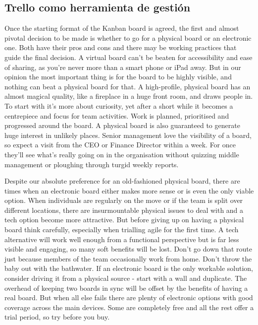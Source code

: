 \subsection{Trello como herramienta de gestión}\label{subsec:trello}

Once the starting format of the Kanban board is agreed, the
first and almost pivotal decision to be made is whether to go for
a physical board or an electronic one. Both have their pros and
cons and there may be working practices that guide the final
decision. A virtual board can't be beaten for accessibility and
ease of sharing, as you're never more than a smart phone or
iPad away. But in our opinion the most important thing is for
the board to be highly visible, and nothing can beat a physical
board for that.
A high-profile, physical board has an almost magical quality, like
a fireplace in a huge front room, and draws people in. To start
with it's more about curiosity, yet after a short while it becomes
a centrepiece and focus for team activities. Work is planned,
prioritised and progressed around the board. A physical board
is also guaranteed to generate huge interest in unlikely places.
Senior management love the visibility of a board, so expect a
visit from the CEO or Finance Director within a week. For
once they'll see what's really going on in the organisation
without quizzing middle management or ploughing through
turgid weekly reports.

Despite our absolute preference for an old-fashioned physical
board, there are times when an electronic board either makes
more sense or is even the only viable option. When individuals
are regularly on the move or if the team is split over different
locations, there are insurmountable physical issues to deal with
and a tech option become more attractive.
But before giving up on having a physical board think carefully,
especially when trialling agile for the first time. A tech alternative
will work well enough from a functional perspective but is far
less visible and engaging, so many soft benefits will be lost.
Don't go down that route just because members of the team
occasionally work from home. Don't throw the baby out with
the bathwater.
If an electronic board is the only workable solution, consider
driving it from a physical source - start with a wall and duplicate.
The overhead of keeping two boards in sync will be offset by the
benefits of having a real board. But when all else fails there are
plenty of electronic options with good coverage across the main
devices. Some are completely free and all the rest offer a trial
period, so try before you buy.

